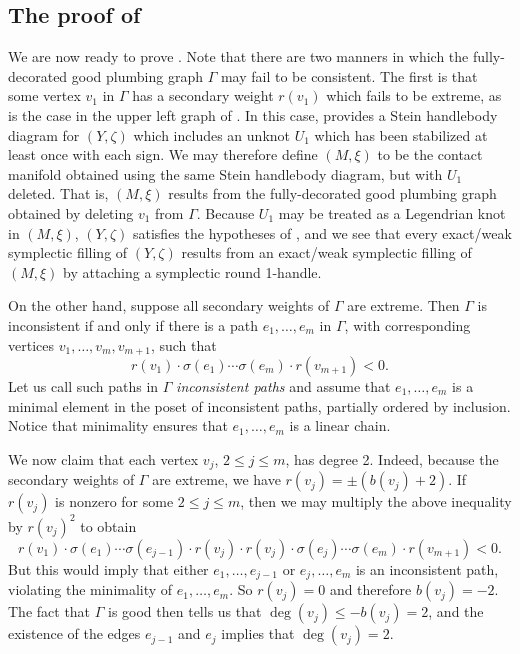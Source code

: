 \documentclass[11pt]{amsart}
\numberwithin{equation}{section}
\theoremstyle{plain}
\theoremstyle{definition}
\theoremstyle{remark}\newtheorem{rem}[equation]{Remark}%
\theoremstyle{remark}\newtheorem{obs}[equation]{Observation}%
\begin{document}
\subsection{The proof of }
We are now ready to prove .  Note that there are two manners in which the fully-decorated good plumbing graph $\Gamma$ may fail to be consistent.  The first is that some vertex $v_1$ in $\Gamma$ has a secondary weight $r(v_1)$ which fails to be extreme, as is the case in the upper left graph of .  In this case,  provides a Stein handlebody diagram for $(Y,\zeta)$ which includes an unknot $U_1$ which has been stabilized at least once with each sign.  We may therefore define $(M,\xi)$ to be the contact manifold obtained using the same Stein handlebody diagram, but with $U_1$ deleted.  That is, $(M,\xi)$ results from the fully-decorated good plumbing graph obtained by deleting $v_1$ from $\Gamma$.  Because $U_1$ may be treated as a Legendrian knot in $(M,\xi)$, $(Y,\zeta)$ satisfies the hypotheses of , and we see that every exact/weak symplectic filling of $(Y,\zeta)$ results from an exact/weak symplectic filling of $(M,\xi)$ by attaching a symplectic round 1-handle.

On the other hand, suppose all secondary weights of $\Gamma$ are extreme.  Then $\Gamma$ is inconsistent if and only if there is a path $e_1,\ldots,e_m$ in $\Gamma$, with corresponding vertices $v_1,\ldots,v_m,v_{m+1}$, such that
\[
r(v_1)\cdot\sigma(e_1)\cdots\sigma(e_m)\cdot r(v_{m+1}) < 0.
\]
Let us call such paths in $\Gamma$ \emph{inconsistent paths} and assume that $e_1,\ldots,e_m$ is a minimal element in the poset of inconsistent paths, partially ordered by inclusion.  Notice that minimality ensures that $e_1,\ldots,e_m$ is a linear chain.

We now claim that each vertex $v_j$, $2\leq j\leq m$, has degree 2.  Indeed, because the secondary weights of $\Gamma$ are extreme, we have $r(v_j)=\pm(b(v_j)+2)$.  If $r(v_j)$ is nonzero for some $2\leq j\leq m$, then we may multiply the above inequality by $r(v_j)^2$ to obtain
\[
r(v_1)\cdot\sigma(e_1)\cdots\sigma(e_{j-1})\cdot r(v_j)\cdot r(v_j)\cdot\sigma(e_j)\cdots\sigma(e_m)\cdot r(v_{m+1}) < 0.
\]
But this would imply that either $e_1,\ldots,e_{j-1}$ or $e_j,\ldots,e_m$ is an inconsistent path, violating the minimality of $e_1,\ldots,e_m$.  So $r(v_j)=0$ and therefore $b(v_j)=-2$.  The fact that $\Gamma$ is good then tells us that $\deg(v_j)\leq -b(v_j)=2$, and the existence of the edges $e_{j-1}$ and $e_j$ implies that $\deg(v_j)=2$.
\end{document}
